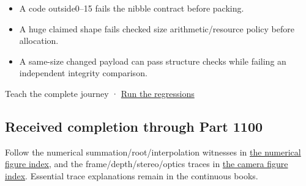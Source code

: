 \hypertarget{appendix-92ff77d4dfdc-three-failure-paths-that-must-not-be-confused}{}

\begin{itemize}
\tightlist
\item
  A code outside0--15 fails the nibble contract before packing.
\item
  A huge claimed shape fails checked size arithmetic/resource policy before allocation.
\item
  A same-size changed payload can pass structure checks while failing an independent integrity comparison.
\end{itemize}

{Teach the complete journey} · \hyperref[appendix-4e2236f53445-representation-codecs-and-bounded-file-laboratory]{Run the regressions}

\subsection{Received completion through Part 1100}\label{appendix-92ff77d4dfdc-received-completion-through-part-1100}

\hypertarget{appendix-92ff77d4dfdc-received-completion-through-part-1100}{}

Follow the numerical summation/root/interpolation witnesses in \hyperref[appendix-cb5af353ef77-numerical-reliability-figures-and-their-explanations]{the numerical figure index}, and the frame/depth/stereo/optics traces in \hyperref[appendix-a2b71a18f5a2-figures-and-their-full-explanations]{the camera figure index}. Essential trace explanations remain in the continuous books.
